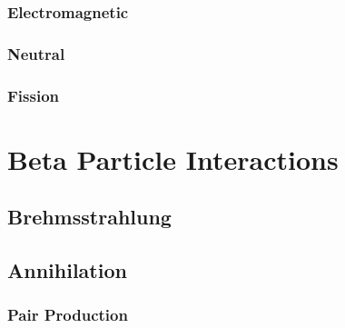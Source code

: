 \subsubsection{Electromagnetic}
\subsubsection{Neutral}
\subsubsection{Fission}

\section{Beta Particle Interactions}
\subsection{Brehmsstrahlung}
\subsection{Annihilation}
\subsubsection{Pair Production}







